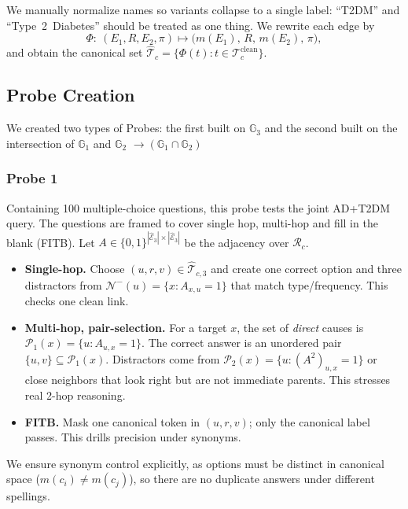 We manually normalize names so variants collapse to a single label: ``T2DM'' and ``Type~2~Diabetes'' should be treated as one thing. We rewrite each edge by
\[
\Phi:\ (E_1, R, E_2,\pi)\mapsto \big(m(E_1),\,R,\,m(E_2),\,\pi\big),
\]
and obtain the canonical set $\widehat{\mathcal{T}}_c=\{\Phi(t):t\in\mathcal{T}_c^{\mathrm{clean}}\}$.

\subsection{Probe Creation}
We created two types of Probes: the first built on $\mathbb{G}_3$ and the second built on the intersection of $\mathbb{G}_1$ and $\mathbb{G}_2$ $\rightarrow (\mathbb{G}_1 \cap \mathbb{G}_2)$

\subsubsection{Probe 1}
Containing 100 multiple-choice questions, this probe tests the joint AD+T2DM query. The questions are framed to cover single hop, multi-hop and fill in the blank (FITB).  Let $A\in\{0,1\}^{|\widehat{\mathcal{E}}_3|\times|\widehat{\mathcal{E}}_3|}$ be the adjacency over $\mathcal{R}_c$.
\begin{itemize}
  \item \textbf{Single-hop.} Choose $(u,r,v)\!\in\!\widehat{\mathcal{T}}_{c,3}$ and create one correct option and three distractors from $\mathcal{N}^{-}(u)=\{x:A_{x,u}=1\}$ that match type/frequency. This checks one clean link.
  \item \textbf{Multi-hop, pair-selection.} For a target $x$, the set of \emph{direct} causes is $\mathcal{P}_1(x)=\{u:A_{u,x}=1\}$. The correct answer is an unordered pair $\{u,v\}\subseteq\mathcal{P}_1(x)$. Distractors come from $\mathcal{P}_2(x)=\{u:(A^2)_{u,x}=1\}$ or close neighbors that look right but are not immediate parents. This stresses real 2-hop reasoning.
  \item \textbf{FITB.} Mask one canonical token in $(u,r,v)$; only the canonical label passes. This drills precision under synonyms.
\end{itemize}
We ensure synonym control explicitly, as options must be distinct in canonical space ($m(c_i)\neq m(c_j)$), so there are no duplicate answers under different spellings.


